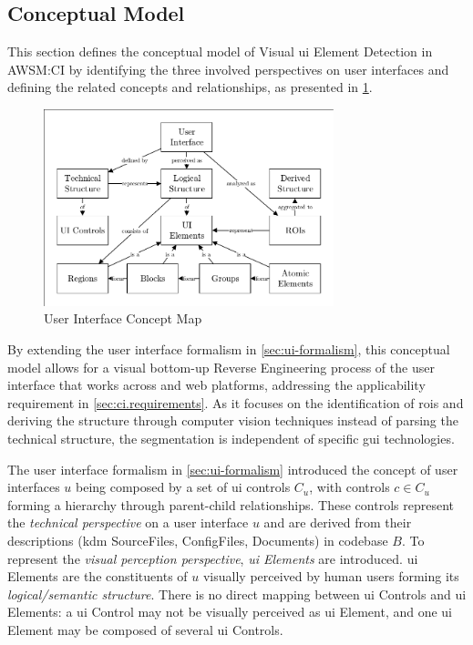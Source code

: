 \vspace{-15pt}
\hypertarget{sec:segmentation.concept}{%
\subsection{Conceptual Model}\label{sec:segmentation.concept}}
This section defines the conceptual model of Visual \gls{ui} Element Detection in AWSM:CI by identifying the three involved perspectives on user interfaces and defining the related concepts and relationships, as presented in \cref{fig:ci-concepts}.
\begin{figure}[h!]
\hypertarget{fig:ci-concepts}{%
\centering
\includegraphics[width=0.75\textwidth]{../figures/awsm-ci-concepts.pdf}
\caption{User Interface Concept Map}\label{fig:ci-concepts}
}
\end{figure}

By extending the user interface formalism in \cref{sec:ui-formalism}, this conceptual model allows for a visual bottom-up \gls{Reverse Engineering} process of the user interface that works across  and \gls{web} platforms, addressing the applicability requirement in \cref{sec:ci.requirements}.
As it focuses on the identification of \glspl{roi} and deriving the structure through computer vision techniques instead of parsing the technical structure, the segmentation is independent of specific \gls{gui} technologies.

The user interface formalism in \cref{sec:ui-formalism} introduced the concept of user interfaces \(u\) being composed by a set of \gls{ui} controls \(C_u\), with controls \(c\in C_u\) forming a hierarchy through parent-child relationships.
These controls represent the \emph{technical perspective} on a user interface \(u\) and are derived from their descriptions (\gls{kdm} SourceFiles, ConfigFiles, Documents) in codebase \(B\).
To represent the \emph{visual perception perspective}, \emph{\gls{ui} Elements} are introduced.
\gls{ui} Elements are the constituents of \(u\) visually perceived by human users forming its \emph{logical/semantic structure}.
There is no direct mapping between \gls{ui} Controls and \gls{ui} Elements: a \gls{ui} Control may not be visually perceived as \gls{ui} Element, and one \gls{ui} Element may be composed of several \gls{ui} Controls.

